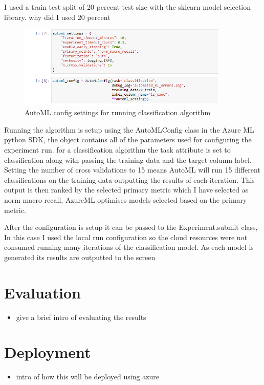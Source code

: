 I used a train test split of 20 percent test size with the sklearn model selection library. why did I used 20 percent

\begin{figure}[hbt!]
 \includegraphics[width=10cm]{figures/auto_ml_settings.png}
 \caption{AutoML config settings for running classification algorithm}
\end{figure}

Running the algorithm is setup using the AutoMLConfig class in the Azure ML python SDK, the object contains all of the parameters used for configuring the experiment run. for a classification algorithm the task attribute is set to classification along with passing the training data and the target column label. Setting the number of cross validations to 15 means AutoML will run 15 different classifications on the training data outputting the results of each iteration. This output is then ranked by the selected primary metric which I have selected as norm macro recall, AzureML optimises models selected based on the primary metric. 

After the configuration is setup it can be passed to the Experiment.submit class, In this case I used the local run configuration so the cloud resources were not consumed running many iterations of the classification model. As each model is generated its results are outputted to the screen

\section{Evaluation}

\begin{itemize}
\item give a brief intro of evaluating the results
\end{itemize}


\section{Deployment}

\begin{itemize}
\item intro of how this will be deployed using azure
\end{itemize}



